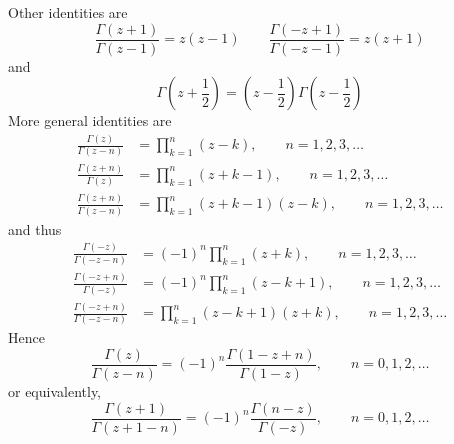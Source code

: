 Other identities are
\begin{equation}
	\frac{\Gamma(z + 1)}{\Gamma(z - 1)} = z (z - 1) \qquad \frac{\Gamma(- z  +1)}{\Gamma(- z - 1)} = z (z + 1)
\end{equation}
and
\begin{equation}
	\Gamma\left(z + \frac{1}{2} \right)  = \left(z - \frac{1}{2} \right) \Gamma\left(z - \frac{1}{2} \right) 
\end{equation}
More general identities are
\begin{equation}
\begin{split}
	\frac{\Gamma(z)}{\Gamma(z - n)} &= \prod_{k = 1}^{n} (z - k), \qquad n = 1, 2, 3, \ldots \\
	\frac{\Gamma(z + n)}{\Gamma(z)} &= \prod_{k = 1}^{n} (z + k - 1), \qquad n = 1, 2, 3, \ldots \\
	\frac{\Gamma(z + n)}{\Gamma(z - n)} &= \prod_{k = 1}^{n} (z + k - 1)(z - k), \qquad n = 1, 2, 3, \ldots
\end{split}
\end{equation}
and thus
\begin{equation}
\begin{split}
	\frac{\Gamma(-z)}{\Gamma(-z - n)} &= (-1)^{n} \prod_{k = 1}^{n} (z + k), \qquad n = 1, 2, 3, \ldots \\
	\frac{\Gamma(-z + n)}{\Gamma(-z)} &= (-1)^{n} \prod_{k = 1}^{n} (z - k + 1), \qquad n = 1, 2, 3, \ldots \\
	\frac{\Gamma(-z + n)}{\Gamma(-z - n)} &= \prod_{k = 1}^{n} (z - k + 1)(z + k), \qquad n = 1, 2, 3, \ldots
\end{split}
\end{equation}
Hence
\begin{equation}
	\frac{\Gamma(z)}{\Gamma(z - n)} = (-1)^{n} \frac{\Gamma(1 - z + n)}{\Gamma(1 - z)}, \qquad n = 0, 1, 2, \ldots
\end{equation}
or equivalently,
\begin{equation}
	\frac{\Gamma(z + 1)}{\Gamma(z + 1 - n)} = (-1)^{n} \frac{\Gamma(n - z)}{\Gamma(-z)}, \qquad n = 0, 1, 2, \ldots
\end{equation}

